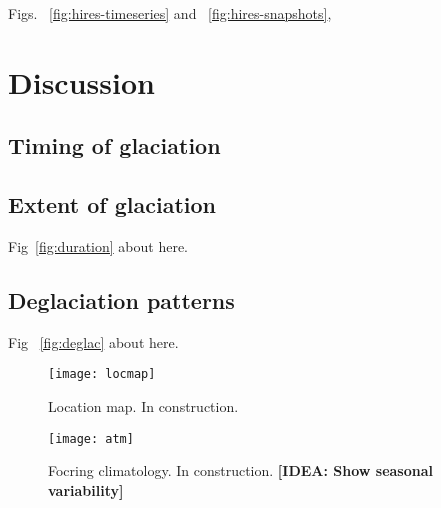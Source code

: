 \documentclass[tc, ms]{copernicus}
\def\idea#1{\textcolor[rgb]{0,0.5,0}{\textbf{[IDEA: #1]}}}
\begin{document}
Figs. ~\ref{fig:hires-timeseries} and ~\ref{fig:hires-snapshots},

\section{Discussion}
\label{sec:discussion}

\subsection{Timing of glaciation}

\subsection{Extent of glaciation}

Fig~\ref{fig:duration} about here.

\subsection{Deglaciation patterns}

Fig ~\ref{fig:deglac} about here.

\conclusions
\label{sec:concl}


%


\begin{figure}
  \texttt{[image: locmap]}
  \caption{Location map. In construction.}
  \label{fig:locmap}
\end{figure}

\begin{figure}
  \texttt{[image: atm]}
  \caption{Focring climatology. In construction.
           \idea{Show seasonal variability}}
  \label{fig:atm}
\end{figure}
\end{document}

